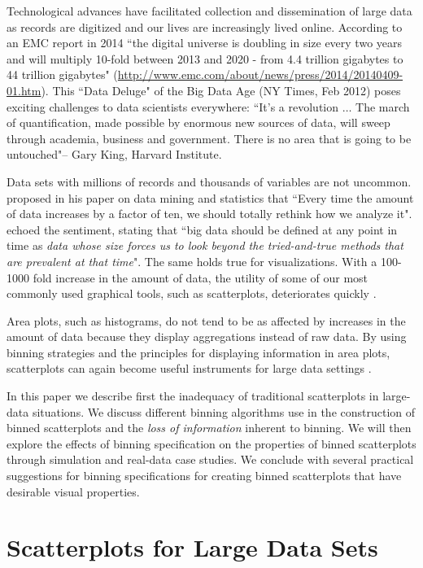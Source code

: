 \documentclass[11pt]{isuthesis}\usepackage[]{graphicx}\usepackage[]{color}
\begin{document}
Technological advances have facilitated collection and dissemination of large data as records are digitized and our lives are increasingly lived online. According to an EMC report in 2014 ``the digital universe is doubling in size every two years and will multiply 10-fold between 2013 and 2020 - from 4.4 trillion gigabytes to 44 trillion gigabytes" (\url{http://www.emc.com/about/news/press/2014/20140409-01.htm}). This ``Data Deluge" of the Big Data Age (NY Times, Feb 2012) poses exciting challenges to data scientists everywhere: ``It's a revolution $\dots$ The march of quantification, made possible by enormous new sources of data, will sweep through academia, business and government. There is no area that is going to be untouched"-- Gary King, Harvard Institute.  
 
Data sets with millions of records and thousands of variables are not uncommon. \citet{Friedman97} proposed in his paper on data mining and statistics that ``Every time the amount of data increases by a factor of ten, we should totally rethink how we analyze it". \citet{jacobs2009} echoed the sentiment, stating that ``big data should be defined at any point in time as \textit{data whose size forces us to look beyond the tried-and-true methods that are prevalent at that time}". The same holds true for visualizations. With a 100-1000 fold increase in the amount of data, the utility of some of our most commonly used graphical tools, such as scatterplots, deteriorates quickly \citep{gold}. 

Area plots, such as histograms, do not tend to be as affected by increases in the amount of data because they display aggregations instead of raw data. By using binning strategies and the principles for displaying information in area plots, scatterplots can again become useful instruments for large data settings \citep{gold}.

In this paper we describe first the inadequacy of traditional scatterplots in large-data situations. We discuss different binning algorithms use in the construction of binned scatterplots and the \textit{loss of information} inherent to binning. We will then explore the effects of binning specification on the properties of binned scatterplots through simulation and real-data case studies. We conclude with several practical suggestions for binning specifications for creating binned scatterplots that have desirable visual properties. 

\section{Scatterplots for Large Data Sets}
\label{Scatter}
\end{document}
